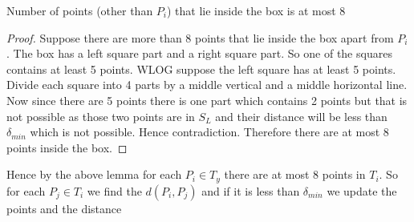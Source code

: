 \pagebreak
\begin{center}
	\begin{minipage}{0.7\textwidth}

\begin{lemma}{}{}
	Number of points (other than $P_i$) that lie inside the box is at most 8
\end{lemma}
\begin{proof}
	Suppose there are more than 8 points that lie inside the box apart from $P_i$. The box has a left square part and a right square part. So one of the squares contains at least 5 points. WLOG suppose the left square has at least 5 points. Divide each square into 4 parts by a middle vertical and a middle horizontal line. Now since there are 5 points there is one part which contains 2 points but that is not possible as those two points are in $S_L$ and their distance will be less than $\delta_{min}$ which is not possible. Hence contradiction. Therefore there are at most 8 points inside the box.
\end{proof}\parinn

Hence by the above lemma for each $P_i\in T_y$ there are at most 8 points in $T_i$. So for each $P_j\in T_i$ we find the $d(P_i,P_j)$ and if it is less than $\delta_{min}$ we update the points and the distance
	\end{minipage}
\hspace{1cm}
\begin{minipage}{0.229\textwidth}
	



\begin{tikzpicture}[x=0.75pt,y=0.75pt,yscale=-1,xscale=1]
	

\end{tikzpicture}
\end{minipage}
\end{center}
